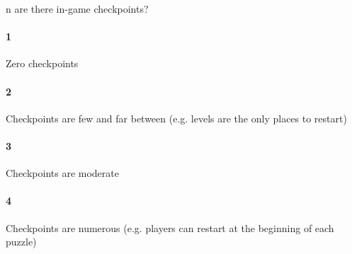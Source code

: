 n are there in-game checkpoints?\paragraph{1}Zero checkpoints\paragraph{2}Checkpoints are few and far between (e.g. levels are the only places to restart)\paragraph{3}Checkpoints are moderate\paragraph{4}Checkpoints are numerous (e.g. players can restart at the beginning of each puzzle)\paragrap